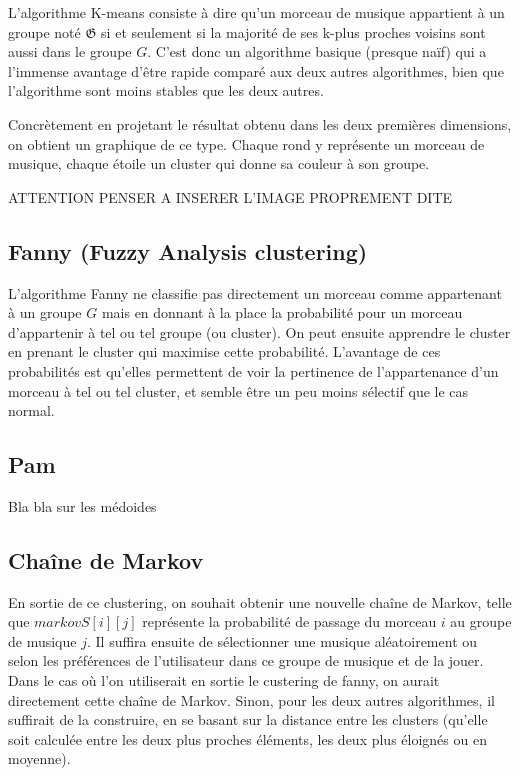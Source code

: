 \documentclass{report}
\begin{document}
L'algorithme K-means consiste à dire qu'un morceau de musique appartient à un groupe noté $\mathfrak{G}$ si et seulement si la majorité de ses k-plus proches voisins sont aussi dans le groupe $G$. C'est donc un algorithme basique (presque naïf) qui a l'immense avantage d'être rapide comparé aux deux autres algorithmes, bien que l'algorithme sont moins stables que les deux autres.

Concrètement en projetant le résultat obtenu dans les deux premières dimensions, on obtient un graphique de ce type. Chaque rond y représente un morceau de musique, chaque étoile un cluster qui donne sa couleur à son groupe.

ATTENTION PENSER A INSERER L'IMAGE PROPREMENT DITE

\subsection{Fanny (Fuzzy Analysis clustering)}

L'algorithme Fanny ne classifie pas directement un morceau comme appartenant à un groupe $G$ mais en donnant à la place la probabilité pour un morceau d'appartenir à tel ou tel groupe (ou cluster). On peut ensuite apprendre le cluster en prenant le cluster qui maximise cette probabilité. L'avantage de ces probabilités est qu'elles permettent de voir la pertinence de l'appartenance d'un morceau à tel ou tel cluster, et semble être un peu moins sélectif que le cas normal.

\subsection{Pam}

Bla bla sur les médoides


\subsection{Chaîne de Markov}

En sortie de ce clustering, on souhait obtenir une nouvelle chaîne de Markov, telle que $markovS[i][j]$ représente la probabilité de passage du morceau $i$ au groupe de musique $j$. Il suffira ensuite de sélectionner une musique aléatoirement ou selon les préférences de l'utilisateur dans ce groupe de musique et de la jouer. Dans le cas où l'on utiliserait en sortie le custering de fanny, on aurait directement cette chaîne de Markov. Sinon, pour les deux autres algorithmes, il suffirait de la construire, en se basant sur la distance entre les clusters (qu'elle soit calculée entre les deux plus proches éléments, les deux plus éloignés ou en moyenne).
\end{document}
